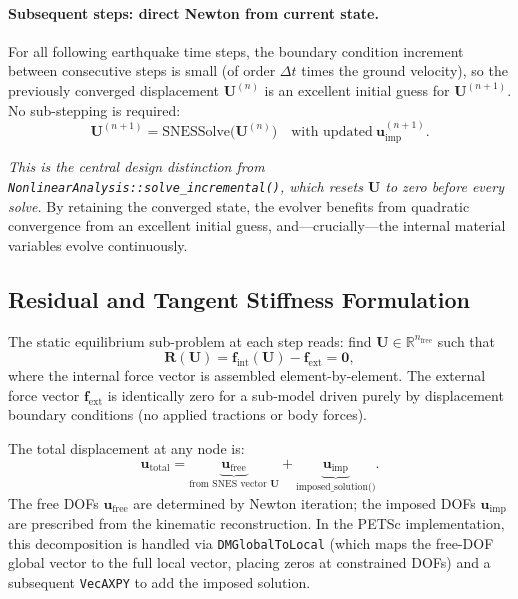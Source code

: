 \paragraph{Subsequent steps: direct Newton from current state.}
For all following earthquake time steps, the boundary condition
increment between consecutive steps is small (of order $\Delta t$
times the ground velocity), so the previously converged displacement
$\mathbf{U}^{(n)}$ is an excellent initial guess for
$\mathbf{U}^{(n+1)}$.  No sub-stepping is required:
\begin{equation}
  \mathbf{U}^{(n+1)}
  = \text{SNESSolve}\bigl(\mathbf{U}^{(n)}\bigr)
  \quad\text{with updated}~
  \mathbf{u}_{\mathrm{imp}}^{(n+1)}.
  \label{eq:nlevo-subsequent}
\end{equation}

\emph{This is the central design distinction from
\texttt{NonlinearAnalysis::solve\_incremental()}, which resets
$\mathbf{U}$ to zero before every solve.}  By retaining the converged
state, the evolver benefits from quadratic convergence from an
excellent initial guess, and---crucially---the internal material
variables evolve continuously.


\subsection{Residual and Tangent Stiffness Formulation}
\label{ssec:nlevo-residual}

The static equilibrium sub-problem at each step reads:
find $\mathbf{U} \in \mathbb{R}^{n_{\mathrm{free}}}$ such that
\begin{equation}
  \mathbf{R}(\mathbf{U})
  = \mathbf{f}_{\mathrm{int}}(\mathbf{U})
  - \mathbf{f}_{\mathrm{ext}}
  = \mathbf{0},
  \label{eq:nlevo-equilibrium}
\end{equation}
where the internal force vector is assembled element-by-element.  The
external force vector $\mathbf{f}_{\mathrm{ext}}$ is identically zero
for a sub-model driven purely by displacement boundary conditions
(no applied tractions or body forces).

The total displacement at any node is:
\begin{equation}
  \mathbf{u}_{\mathrm{total}}
  = \underbrace{\mathbf{u}_{\mathrm{free}}}_{\text{from SNES vector } \mathbf{U}}
  + \underbrace{\mathbf{u}_{\mathrm{imp}}}_{\text{imposed\_solution()}}.
  \label{eq:nlevo-total-disp}
\end{equation}
The free DOFs $\mathbf{u}_{\mathrm{free}}$ are determined by Newton
iteration; the imposed DOFs $\mathbf{u}_{\mathrm{imp}}$ are prescribed
from the kinematic reconstruction.  In the PETSc implementation, this
decomposition is handled via \texttt{DMGlobalToLocal} (which maps the
free-DOF global vector to the full local vector, placing zeros at
constrained DOFs) and a subsequent \texttt{VecAXPY} to add the
imposed solution.

